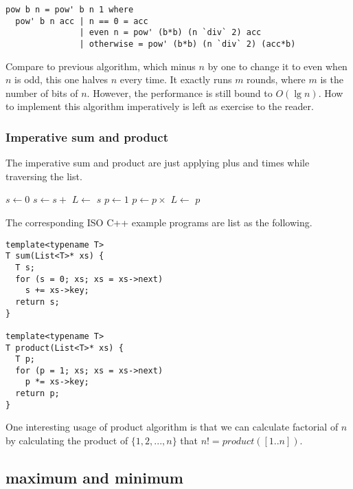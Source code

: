 \documentclass[b5paper]{article}
\begin{document}
\lstset{language=Haskell}
\begin{lstlisting}
pow b n = pow' b n 1 where
  pow' b n acc | n == 0 = acc
               | even n = pow' (b*b) (n `div` 2) acc
               | otherwise = pow' (b*b) (n `div` 2) (acc*b)
\end{lstlisting}

Compare to previous algorithm, which minus $n$ by one to change it to even when $n$ is odd, this one halves $n$ every
time. It exactly runs $m$ rounds, where $m$ is the number of bits of $n$. However, the performance is still bound to
$O(\lg n)$. How to implement this algorithm imperatively is left as exercise to the reader.

\subsubsection{Imperative sum and product}
The imperative sum and product are just applying plus and times while traversing the list.

\begin{algorithmic}[1]
  \State $s \gets 0$
    \State $s \gets s +$ 
    \State $L \gets$ 
  \EndWhile
  \State \Return $s$
\EndFunction
\Statex
{}
  \State $p \gets 1$
    \State $p \gets p \times $ 
    \State $L \gets$ 
  \EndWhile
  \State \Return $p$
\EndFunction
\end{algorithmic}

The corresponding ISO C++ example programs are list as the following.

\lstset{language=C++}
\begin{lstlisting}
template<typename T>
T sum(List<T>* xs) {
  T s;
  for (s = 0; xs; xs = xs->next)
    s += xs->key;
  return s;
}

template<typename T>
T product(List<T>* xs) {
  T p;
  for (p = 1; xs; xs = xs->next)
    p *= xs->key;
  return p;
}
\end{lstlisting}

One interesting usage of product algorithm is that we can calculate factorial of $n$ by calculating the
product of $\{1, 2, ..., n\}$ that $n! = product([1..n])$.

\subsection{maximum and minimum}
\end{document}
